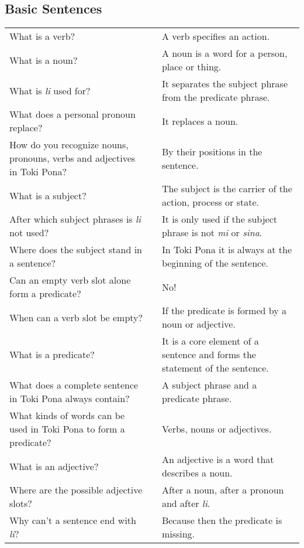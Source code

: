 \subsection*{Basic Sentences} 
\label{'basic_sentences'}
%
\begin{supertabular}{p{5,5cm}|ll}
What is a verb? && A verb specifies an action. \\ %
What is a noun? &&  A noun is a word for a person, place or thing. \\ %
What is \textit{li} used for?  &&  It separates the subject phrase from the predicate phrase.  \\ %
What does a personal pronoun replace? && It replaces a noun. \\ %
How do you recognize nouns, pronouns, verbs and adjectives in Toki Pona? && By their positions in the sentence. \\ %
What is a subject?  &&   The subject is the carrier of the action, process or state. \\ %
After which subject phrases is \textit{li} not used?  &&   It is only used if the subject phrase is not \textit{mi} or \textit{sina}. \\ %
Where does the subject stand in a sentence?  &&  In Toki Pona it is always at the beginning of the sentence. \\ %
Can an empty verb slot alone form a predicate? && No!  \\ %
When can a verb slot be empty?  &&   If the predicate is formed by a noun or adjective.  \\ %
What is a predicate?  &&   It is a core element of a sentence and forms the statement of the sentence. \\ %
What does a complete sentence in Toki Pona always contain?  &&  A subject phrase and a predicate phrase.  \\ %
What kinds of words can be used in Toki Pona to form a predicate? && Verbs, nouns or adjectives.  \\ %
What is an adjective?  &&  An adjective is a word that describes a noun.  \\ %
Where are the possible adjective slots?  &&  After a noun, after a pronoun and after \textit{li}. \\  %
Why can't a sentence end with \textit{li}? && Because then the predicate is missing. \\ %
\end{supertabular} 

